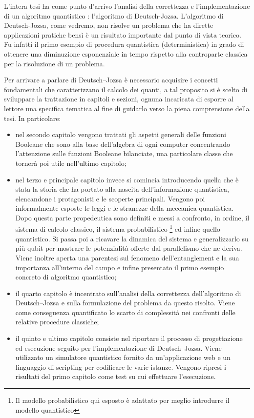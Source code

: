 \documentclass[12pt,a4paper,openright]{report}
\begin{document}
L'intera tesi ha come punto d'arrivo l'analisi della correttezza e l'implementazione di un algoritmo quantistico : l'algoritmo di Deutsch-Jozsa. L'algoritmo di Deutsch-Jozsa, come vedremo, non risolve un problema che ha dirette applicazioni
pratiche bensì è un risultato importante dal punto di vista teorico. Fu infatti il primo esempio di procedura quantistica (deterministica) in grado di ottenere una diminuzione esponenziale in tempo rispetto alla controparte
classica per la risoluzione di un problema.\par
Per arrivare a parlare di Deutsch–Jozsa è necessario acquisire i concetti fondamentali che caratterizzano il calcolo dei quanti, a tal proposito si è scelto
di sviluppare la trattazione in capitoli e sezioni, ognuna incaricata di esporre al lettore una specifica tematica al fine di guidarlo verso la piena comprensione della tesi.
In particolare:     
\begin{itemize}
    \item nel secondo capitolo vengono trattati gli aspetti generali delle funzioni Booleane che sono alla base dell'algebra di ogni computer concentrando l'attenzione
          sulle funzioni Booleane bilanciate, una particolare classe che tornerà poi utile nell'ultimo capitolo;

    \item nel terzo e principale capitolo invece si comincia introducendo quella che è stata la storia che ha portato alla nascita dell'informazione quantistica,
          elencandone i protagonisti e le scoperte principali. Vengono poi informalmente esposte le leggi e le stranezze della meccanica quantistica. Dopo 
          questa parte propedeutica sono definiti e messi a confronto, in ordine, il sistema di calcolo classico, il sistema probabilistico \footnote{Il modello probabilistico
          qui esposto è adattato per meglio introdurre il modello quantistico} ed infine quello quantistico. Si passa poi a ricavare la dinamica del sistema e generalizzarlo
          su più qubit per mostrare le potenzialità offerte dal parallelismo che ne deriva. Viene inoltre aperta una parentesi sul fenomeno dell'entanglement
          e la sua importanza all'interno del campo e infine presentato il primo esempio concreto di algoritmo quantistico;
    
    \item il quarto capitolo è incentrato sull'analisi della correttezza dell'algoritmo di Deutsch–Jozsa e sulla formulazione del problema da questo risolto. Viene 
          come conseguenza quantificato lo scarto di complessità nei confronti delle relative procedure classiche;
          
    \item il quinto e ultimo capitolo consiste nel riportare il processo di progettazione ed esecuzione seguito per l'implementazione di Deutsch–Jozsa.
          Viene utilizzato un simulatore quantistico fornito da un'applicazione web e un linguaggio di scripting per codificare le varie istanze. Vengono ripresi
          i risultati del primo capitolo come test su cui effettuare l'esecuzione.
             
\end{itemize}     
\end{document}
